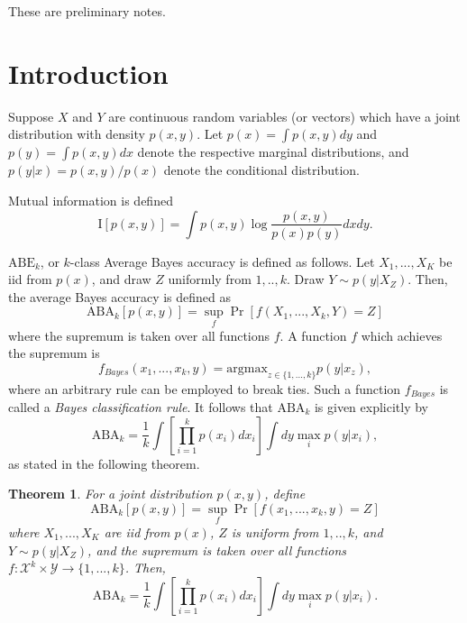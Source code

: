 \documentclass[12pt]{article}
\begin{document}
\maketitle

\newcommand{\tr}{\text{tr}}
\newcommand{\E}{\textbf{E}}
\newcommand{\diag}{\text{diag}}
\newcommand{\argmax}{\text{argmax}}
\newcommand{\Cov}{\text{Cov}}
\newcommand{\Var}{\text{Var}}
\newcommand{\argmin}{\text{argmin}}
\newcommand{\Vol}{\text{Vol}}
\newcommand{\comm}[1]{}
\newtheorem{theorem}{Theorem}[section]
\newtheorem{proposition}{Proposition}[section]
\newtheorem{corollary}{Corollary}[theorem]
\newtheorem{lemma}[theorem]{Lemma}

These are preliminary notes.

\section{Introduction}

Suppose $X$ and $Y$ are continuous random variables (or vectors) which have a joint distribution with density $p(x, y)$.
Let $p(x) = \int p(x,y) dy$ and $p(y) = \int p(x,y) dx$ denote the respective marginal distributions,
and $p(y|x) = p(x,y)/p(x)$ denote the conditional distribution.

Mutual information is defined
\[
\text{I}[p(x, y)] = \int p(x, y) \log \frac{p(x, y)}{p(x)p(y)} dx dy.
\]

$\text{ABE}_k$, or $k$-class Average Bayes accuracy is defined as follows.  Let $X_1,...,X_K$ be iid from $p(x)$,
and draw $Z$ uniformly from $1,..,k$.  Draw $Y \sim p(y|X_Z)$.
Then, the average Bayes accuracy is defined as
\[
\text{ABA}_k[p(x, y)] = \sup_f \Pr[f(X_1,...,X_k, Y) = Z] 
\]
where the supremum is taken over all functions $f$.  A function $f$ which achieves the supremum is
\[
f_{Bayes}(x_1,...,x_k, y) = \text{argmax}_{z \in \{1,...,k\}} p(y|x_z),
\]
where an arbitrary rule can be employed to break ties.
Such a function $f_{Bayes}$ is called a \emph{Bayes classification rule}.
It follows that $\text{ABA}_k$ is given explicitly by
\[
\text{ABA}_k = \frac{1}{k} \int \left[\prod_{i=1}^k p(x_i) dx_i \right] \int dy \max_i p(y|x_i),
\]
as stated in the following theorem.

\begin{theorem}
For a joint distribution $p(x, y)$, define
\[
\text{ABA}_k[p(x, y)] = \sup_f \Pr[f(x_1,...,x_k, y) = Z] 
\]
where $X_1,...,X_K$ are iid from $p(x)$, $Z$ is uniform from $1,..,k$, and $Y \sim p(y|X_Z)$,
and the supremum is taken over all functions $f: \mathcal{X}^k\times \mathcal{Y} \to \{1,...,k\}$.
Then,
\[
\text{ABA}_k = \frac{1}{k} \int \left[\prod_{i=1}^k p(x_i) dx_i \right] \int dy \max_i p(y|x_i).
\]
\end{theorem}
\end{document}
